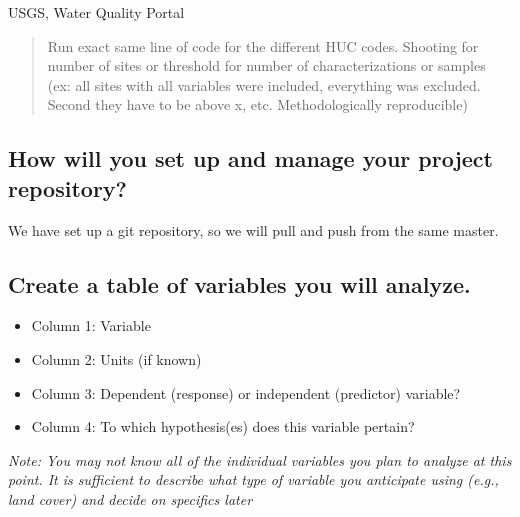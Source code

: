 \documentclass[]{article}
\providecommand{\tightlist}{%
  \setlength{\itemsep}{0pt}\setlength{\parskip}{0pt}}
\begin{document}
USGS, Water Quality Portal

\begin{quote}
Run exact same line of code for the different HUC codes. Shooting for
number of sites or threshold for number of characterizations or samples
(ex: all sites with all variables were included, everything was
excluded. Second they have to be above x, etc. Methodologically
reproducible)
\end{quote}

\hypertarget{how-will-you-set-up-and-manage-your-project-repository}{%
\subsection{How will you set up and manage your project
repository?}\label{how-will-you-set-up-and-manage-your-project-repository}}

We have set up a git repository, so we will pull and push from the same
master.

\hypertarget{create-a-table-of-variables-you-will-analyze.}{%
\subsection{Create a table of variables you will
analyze.}\label{create-a-table-of-variables-you-will-analyze.}}

\begin{itemize}
\tightlist
\item
  Column 1: Variable
\item
  Column 2: Units (if known)
\item
  Column 3: Dependent (response) or independent (predictor) variable?
\item
  Column 4: To which hypothesis(es) does this variable pertain?
\end{itemize}

\emph{Note: You may not know all of the individual variables you plan to
analyze at this point. It is sufficient to describe what type of
variable you anticipate using (e.g., land cover) and decide on specifics
later}
\end{document}
